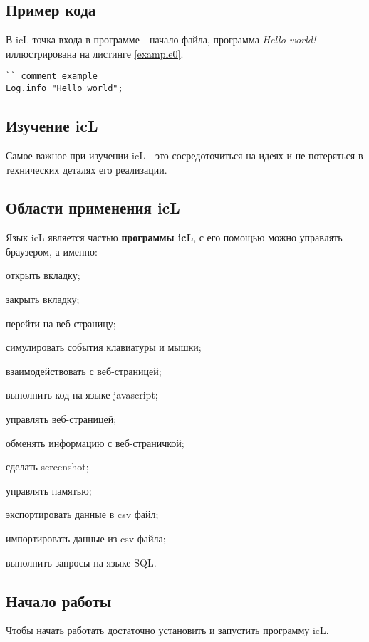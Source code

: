 \subsection{Пример кода}

В icL точка входа в программе - начало файла, программа \textit{Hello world!} иллюстрирована на листинге \ref{example0}.

\begin{sourcecode}
\label{example0}
\begin{verbatim}
`` comment example
Log.info "Hello world";
\end{verbatim}
\end{sourcecode}

\subsection{Изучение icL}

Самое важное при изучении icL - это сосредоточиться на идеях и не потеряться в технических деталях его реализации.

\subsection{Области применения icL}

Язык icL является частью \textbf{программы icL}, с его помощью можно управлять браузером, а именно:
\begin{icItems}
\item
	открыть вкладку;
\item
	закрыть вкладку;
\item
	перейти на веб-страницу;
\item
	симулировать события клавиатуры и мышки;
\item
	взаимодействовать с веб-страницей;
\item
	выполнить код на языке javascript;
\item
	управлять веб-страницей;
\item
	обменять информацию с веб-страничкой;
\item
	сделать screenshot;
\item
	управлять памятью;
\item
	экспортировать данные в csv файл;
\item
	импортировать данные из csv файла;
\item
	выполнить запросы на языке SQL.
\end{icItems}

\subsection{Начало работы}

Чтобы начать работать достаточно установить и запустить программу icL.
